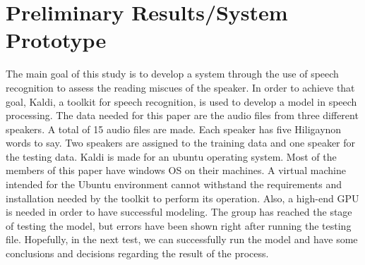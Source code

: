 \chapter{Preliminary Results/System Prototype}
The main goal of this study is to develop a system through the use of speech recognition to assess the reading miscues of the speaker. In order to achieve that goal, Kaldi, a toolkit for speech recognition, is used to develop a model in speech processing. 
The data needed for this paper are the audio files from three different speakers. A total of 15 audio files are made. Each speaker has five Hiligaynon words to say. Two speakers are assigned to the training data and one speaker for the testing data.
Kaldi is made for an ubuntu operating system. Most of the members of this paper have windows OS on their machines. A virtual machine intended for the Ubuntu environment cannot withstand the requirements and installation needed by the toolkit to perform its operation. Also, a high-end GPU is needed in order to have successful modeling. The group has reached the stage of testing the model, but errors have been shown right after running the testing file. Hopefully, in the next test, we can successfully run the model and have some conclusions and decisions regarding the result of the process.